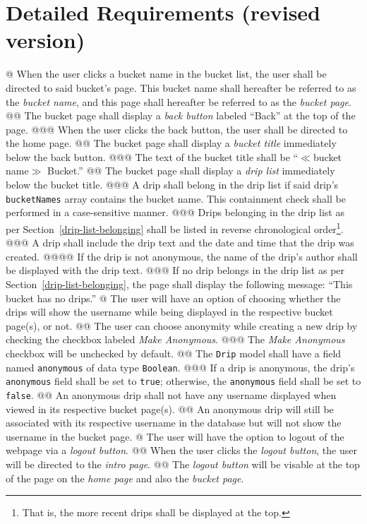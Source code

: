\documentclass{article}
\begin{document}
\section*{Detailed Requirements (revised version)}

\begin{easylist}[articletoc]
@ When the user clicks a bucket name in the bucket list, the user shall be directed to said bucket's page. This bucket name shall hereafter be referred to as the \textit{bucket name}, and this page shall hereafter be referred to as the \textit{bucket page}.
@@ The bucket page shall display a \textit{back button} labeled ``Back'' at the top of the page.
@@@ When the user clicks the back button, the user shall be directed to the home page.
@@ The bucket page shall display a \textit{bucket title} immediately below the back button.
@@@ The text of the bucket title shall be ``$\ll$bucket name$\gg$ Bucket.''
@@ The bucket page shall display a \textit{drip list} immediately below the bucket title.
@@@ \label{drip-list-belonging}A drip shall belong in the drip list if said drip's \texttt{bucketNames} array contains the bucket name. This containment check shall be performed in a case-sensitive manner.
@@@ Drips belonging in the drip list as per Section~\ref{drip-list-belonging} shall be listed in reverse chronological order\footnote{That is, the more recent drips shall be displayed at the top.}.
@@@ A drip shall include the drip text and the date and time that the drip was created.
@@@@ If the drip is not anonymous, the name of the drip's author shall be displayed with the drip text.
@@@ If no drip belongs in the drip list as per Section~\ref{drip-list-belonging}, the page shall display the following message: ``This bucket has no drips.''
@ The user will have an option of choosing whether the drips will show the username while being displayed in the respective bucket page(s), or not.
@@ The user can choose anonymity while creating a new drip by checking the checkbox labeled \textit{Make Anonymous}.
@@@ The \textit{Make Anonymous} checkbox will be unchecked by default.
@@ The \texttt{Drip} model shall have a field named \texttt{anonymous} of data type \texttt{Boolean}.
@@@ If a drip is anonymous, the drip's \texttt{anonymous} field shall be set to \texttt{true}; otherwise, the \texttt{anonymous} field shall be set to \texttt{false}.
@@ An anonymous drip shall not have any username displayed when viewed in its respective bucket page(s).
@@ An anonymous drip will still be associated with its respective username in the database but will not show the username in the bucket page.
@ The user will have the option to logout of the webpage via a \textit{logout button}.
@@ When the user clicks the \textit{logout button}, the user will be directed to the \textit{intro page}.
@@ The \textit{logout button} will be visable at the top of the page on the \textit{home page} and also the \textit{bucket page}.

\end{easylist}
\end{document}
